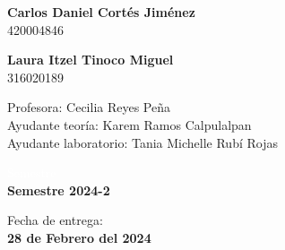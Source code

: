 \begin{titlepage}
\vspace{5mm}

\begin{minipage}{0.4\textwidth}
        \textbf{\large{Carlos Daniel Cortés Jiménez}}\\    
        420004846        
\end{minipage}
\begin{minipage}{0.4\textwidth}
    \begin{flushright}
        \textbf{\large{Laura Itzel Tinoco Miguel}}\\
        316020189
    \end{flushright}
\end{minipage}

\vspace{10mm}

\begin{minipage}{0.8\textwidth}
    \begin{flushleft} \large
        Profesora: Cecilia Reyes Peña\\
        Ayudante teoría: Karem Ramos Calpulalpan \\
        Ayudante laboratorio: Tania Michelle Rubí Rojas\\                    
    \end{flushleft}
\end{minipage}

\vspace{20mm}

\begin{minipage}{0.4\textwidth}
    \textcolor{white}{Semestre}\\
    \large\textbf{Semestre 2024-2}      
\end{minipage}
\begin{minipage}{0.4\textwidth}
    \begin{flushright}
        {\large Fecha de entrega:\\
         \textbf{28 de Febrero del 2024}}
    \end{flushright}
\end{minipage}

\makeatother

\vfill 
\end{titlepage}